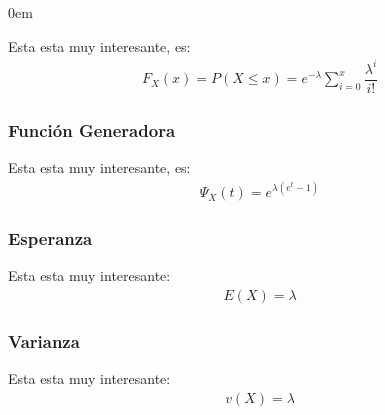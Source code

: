 \documentclass[12pt, fleqn]{report}                             %
\newenvironment{SmallIndentation}[1][0.75em]                    %
        {\begin{adjustwidth}{#1}{}\begin{footnotesize}}             %
        {\end{footnotesize}\end{adjustwidth}}                       %
\theoremstyle{break}                                            %
\begin{document}
\begin{multicols}{2}
\begin{SmallIndentation}[0em]
                        Esta esta muy interesante, es:
                        \begin{align*}
                            F_X(x) 
                                = P(X \leq x)              
                                = e^{-\lambda}\sum_{i = 0}^x \dfrac{\lambda^i}{i!}
                        \end{align*}


                    \subsubsection{Función Generadora}

                        Esta esta muy interesante, es:
                        \begin{align*}
                            \Psi_X(t) 
                                = e^{\lambda(e^t - 1)}
                        \end{align*}


                    \subsubsection{Esperanza}

                        Esta esta muy interesante:
                        \begin{align*}
                            E(X) = \lambda               
                        \end{align*}


                    \subsubsection{Varianza}

                        Esta esta muy interesante:
                        \begin{align*}
                            v(X) = \lambda               
                        \end{align*}


                    


                \end{SmallIndentation}
                \end{multicols}
\end{document}

